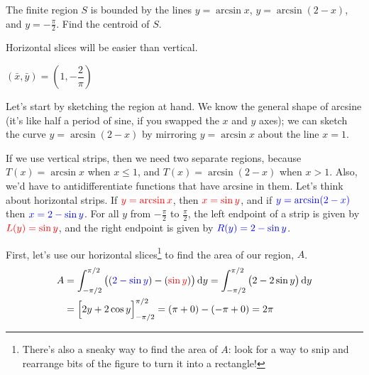 \begin{question}
The finite region $S$ is bounded by the lines $y=\arcsin x$, $y=\arcsin(2-x)$, and $y=-\frac{\pi}{2}$. Find the centroid of $S$.
\end{question}
\begin{hint}
Horizontal slices will be easier than vertical.
\end{hint}
\begin{answer}
$(\bar x, \bar y) = \left( 1,-\dfrac{2}{\pi}\right)$
\end{answer}
\begin{solution}
Let's start by sketching the region at hand. We know the general shape of arcsine (it's like half a period of sine, if you swapped the $x$ and $y$ axes); we can sketch the curve $y=\arcsin(2-x)$ by mirroring $y=\arcsin x$ about the line $x=1$.
\begin{center}
\end{center}

If we use vertical strips, then we need two separate regions, because $T(x) = \arcsin x$ when $x \le 1$, and $T(x) = \arcsin(2-x)$ when $x >1$. Also, we'd have to antidifferentiate functions that have arcsine in them. Let's think about horizontal strips. If $\textcolor{red}{y=\arcsin x}$, then $\textcolor{red}{x=\sin y}$, and if $\textcolor{blue}{y=\arcsin(2-x)}$ then $\textcolor{blue}{x=2-\sin y}$. For all $y$ from $-\frac{\pi}{2}$ to $\frac{\pi}{2}$, the left endpoint of a strip is given by $\textcolor{red}{L(y) = \sin y}$, and the right endpoint is given by $\textcolor{blue}{R(y) = 2-\sin y}$.

First, let's use our horizontal slices\footnote{There's also a sneaky way to find the area of $A$: look for a way to snip and rearrange bits of the figure to turn it into a rectangle!} to find the area of our region, $A$.
\begin{align*}
A&=\int_{-\pi/2}^{\pi/2} \big( (\textcolor{blue}{2-\sin y}) - (\textcolor{red}{\sin y})\big)\,\mathrm{d}y=\int_{-\pi/2}^{\pi/2}\big(2-2\sin y\big)\,\mathrm{d}y\\
&=\Big[2y+2\cos y\Big]_{-\pi/2}^{\pi/2} = \left(\pi+0\right) - \left(-\pi+0\right)=2\pi
\end{align*}



\end{solution}
